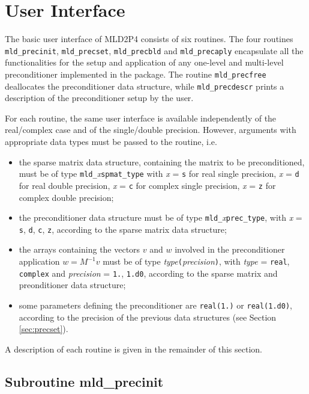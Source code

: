 \section{User Interface\label{sec:highlevel}}

The basic user interface of MLD2P4 consists of six routines. The four routines \verb|mld_precinit|,
\verb|mld_precset|, \verb|mld_precbld| and \verb|mld_precaply| encapsulate all the functionalities
for the setup and application of any one-level and multi-level preconditioner implemented in the package.
The routine \verb|mld_precfree| deallocates the preconditioner data structure, while \verb|mld_precdescr|
prints a description of the preconditioner setup by the user.

For each routine, the same user interface is available independently of the real/complex case
and of the single/double precision. However, arguments with appropriate data types must
be passed to the routine, i.e.\
\begin{itemize}
\item the sparse matrix data structure, containing the matrix to be preconditioned, must be of type
	\verb|mld_|\emph{x}\verb|spmat_type|
	with \emph{x} = \verb|s| for real single precision, \emph{x} = \verb|d| for real double precision,
	\emph{x} = \verb|c| for complex single precision, \emph{x} = \verb|z| for complex double precision;
\item the preconditioner data structure must be of type \verb|mld_|\emph{x}\verb|prec_type|, with \emph{x} =    
  \verb|s|, \verb|d|, \verb|c|, \verb|z|, according to the sparse matrix data structure;
\item the arrays containing the vectors $v$ and $w$ involved in the preconditioner application $w=M^{-1}v$
  must be of type \emph{type}\verb|(|\emph{precision}\verb|)|, with \emph{type} = \verb|real|, \verb|complex| and
  \emph{precision} = \verb|1.|, \verb|1.d0|, according to the sparse matrix and preonditioner data structure;
\item some parameters defining the preconditioner are \verb|real(1.)| or \verb|real(1.d0)|, according
  to the precision of the previous data structures (see Section \ref{sec:precset}).
\end{itemize}
A description of each routine is given in the remainder of this section.


\subsection{Subroutine mld\_precinit\label{sec:precinit}}

